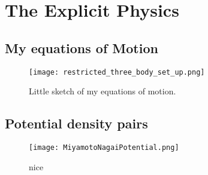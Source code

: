 



\section{The Explicit Physics}
    \subsection*{My equations of Motion} \label{subsec:myEquationsOfMotion}
    \begin{figure}
        \centering
        \texttt{[image: restricted\_three\_body\_set\_up.png]}
        \caption{Little sketch of my equations of motion. }
    \end{figure}

    \subsection{Potential density pairs}

        \begin{figure}
            \centering
            \texttt{[image: MiyamotoNagaiPotential.png]}
            \caption{nice}
        \end{figure}




